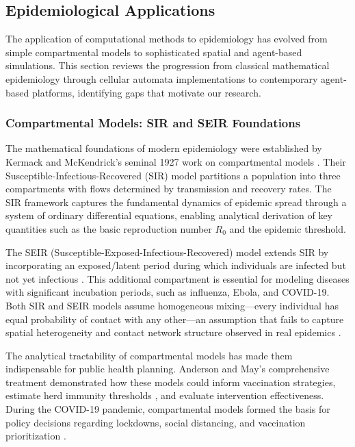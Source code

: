 \subsection{Epidemiological Applications}
\label{sec:related-epidemiology}

The application of computational methods to epidemiology has evolved from simple compartmental models to sophisticated spatial and agent-based simulations. This section reviews the progression from classical mathematical epidemiology through cellular automata implementations to contemporary agent-based platforms, identifying gaps that motivate our research.

\subsubsection{Compartmental Models: SIR and SEIR Foundations}

The mathematical foundations of modern epidemiology were established by Kermack and McKendrick's seminal 1927 work on compartmental models \cite{kermack1927contribution}. Their Susceptible-Infectious-Recovered (SIR) model partitions a population into three compartments with flows determined by transmission and recovery rates. The SIR framework captures the fundamental dynamics of epidemic spread through a system of ordinary differential equations, enabling analytical derivation of key quantities such as the basic reproduction number $R_0$ and the epidemic threshold.

The SEIR (Susceptible-Exposed-Infectious-Recovered) model extends SIR by incorporating an exposed/latent period during which individuals are infected but not yet infectious \cite{anderson1992infectious}. This additional compartment is essential for modeling diseases with significant incubation periods, such as influenza, Ebola, and COVID-19. Both SIR and SEIR models assume homogeneous mixing---every individual has equal probability of contact with any other---an assumption that fails to capture spatial heterogeneity and contact network structure observed in real epidemics \cite{keeling2005networks}.

The analytical tractability of compartmental models has made them indispensable for public health planning. Anderson and May's comprehensive treatment \cite{anderson1992infectious} demonstrated how these models could inform vaccination strategies, estimate herd immunity thresholds \cite{fine2011herd}, and evaluate intervention effectiveness. During the COVID-19 pandemic, compartmental models formed the basis for policy decisions regarding lockdowns, social distancing, and vaccination prioritization \cite{flaxman2020estimating}.

